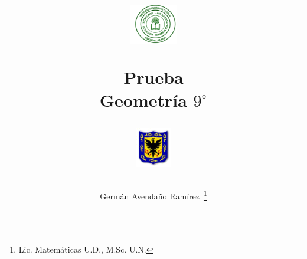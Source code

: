 \documentclass[addpoints]{exam}
\begin{document}
\title{\begin{minipage}{.2\textwidth}
        \includegraphics[height=1.75cm]{Images/logo-colegio.png}
       \end{minipage}
\begin{minipage}{.55\textwidth}
 \begin{center}
Prueba\\Geometría $9^{\circ}$
\end{center}
\end{minipage}
\begin{minipage}{.2\textwidth}
\includegraphics[height=1.75cm]{Images/logo-sed.png} 
\end{minipage}
}
\author{Germ\'{a}n Avendaño Ram\'{i}rez~\thanks{Lic. Matemáticas U.D., M.Sc. U.N.}}
\date{}
\maketitle
\begin{center}
\end{center}
\vspace{0.1in}
\end{document}
